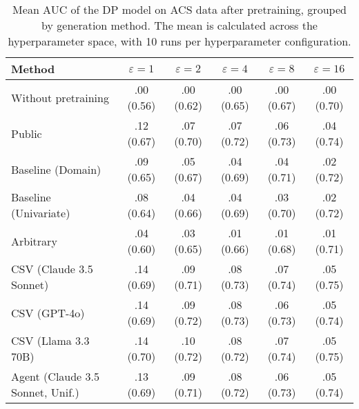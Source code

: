 \begin{table}[h!]
    \centering
    \caption{Mean AUC of the DP model on ACS data after pretraining, grouped by generation method. The mean is calculated across the hyperparameter space, with 10 runs per hyperparameter configuration.}
    \label{tab:epsilon_comparison}
    \begin{tabular}{lccccc}
    \toprule
    Method & $\varepsilon=1$ & $\varepsilon=2$ & $\varepsilon=4$ & $\varepsilon=8$ & $\varepsilon=16$ \\
    \midrule
    Without pretraining & .00 {\small (0.56)} & .00 {\small (0.62)} & .00 {\small (0.65)} & .00 {\small (0.67)} & .00 {\small (0.70)} \\
    \arrayrulecolor{black!50!}\midrule
    Public & .12 {\small (0.67)} & .07 {\small (0.70)} & .07 {\small (0.72)} & .06 {\small (0.73)} & .04 {\small (0.74)} \\
    \arrayrulecolor{black!50!}\midrule
    Baseline (Domain) & .09 {\small (0.65)} & .05 {\small (0.67)} & .04 {\small (0.69)} & .04 {\small (0.71)} & .02 {\small (0.72)} \\
    Baseline (Univariate) & .08 {\small (0.64)} & .04 {\small (0.66)} & .04 {\small (0.69)} & .03 {\small (0.70)} & .02 {\small (0.72)} \\
    \arrayrulecolor{black!50!}\midrule
    Arbitrary & .04 {\small (0.60)} & .03 {\small (0.65)} & .01 {\small (0.66)} & .01 {\small (0.68)} & .01 {\small (0.71)} \\
    \arrayrulecolor{black!50!}\midrule
    CSV (Claude 3.5 Sonnet) & \cellcolor{bronze!30}.14 {\small (0.69)} & \cellcolor{bronze!30}.09 {\small (0.71)} & \cellcolor{gold!30}.08 {\small (0.73)} & \cellcolor{silver!30}.07 {\small (0.74)} & \cellcolor{gold!30}.05 {\small (0.75)} \\
    CSV (GPT-4o) & \cellcolor{silver!30}.14 {\small (0.69)} & \cellcolor{silver!30}.09 {\small (0.72)} & \cellcolor{silver!30}.08 {\small (0.73)} & \cellcolor{bronze!30}.06 {\small (0.73)} & \cellcolor{bronze!30}.05 {\small (0.74)} \\
    CSV (Llama 3.3 70B) & \cellcolor{gold!30}.14 {\small (0.70)} & \cellcolor{gold!30}.10 {\small (0.72)} & \cellcolor{silver!30}.08 {\small (0.72)} & \cellcolor{gold!30}.07 {\small (0.74)} & \cellcolor{silver!30}.05 {\small (0.75)} \\
    \arrayrulecolor{black!50!}\midrule
    Agent (Claude 3.5 Sonnet, Unif.) & .13 {\small (0.69)} & .09 {\small (0.71)} & \cellcolor{silver!30}.08 {\small (0.72)} & .06 {\small (0.73)} & .05 {\small (0.74)} \\

\end{tabular}
\end{table}
